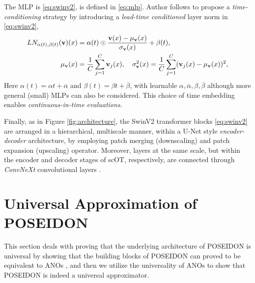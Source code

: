\documentclass[reqno,10pt]{amsart}
\theoremstyle{plain}
\theoremstyle{definition}
\begin{document}
\noindent The MLP is \ref{eq:swinv2}, is defined in \ref{eq:mlp}. Author follows \cite{EP2017} to propose a {\it time-conditioning} strategy by introducing a {\it lead-time conditioned} layer norm in \ref{eq:swinv2},
\begin{equation} \label{eq:LN}
    \begin{aligned}
        LN_{\alpha(t),\beta(t)}({\bf v})(x) &= \alpha(t) \odot \frac{{\bf v}(x) - \mu_{{\bf v}}(x)}{\sigma_{\bf v}(x)} + \beta(t), \\
        \mu_{{\bf v}}(x) &= \frac{1}{C}\sum_{j=1}^{C} {\bf v}_j(x), \quad \sigma_{{\bf v}}^2(x) = \frac{1}{C} \sum_{j=1}^{C} ({\bf v}_j(x) - \mu_{{\bf v}}(x))^2,
    \end{aligned}
\end{equation}
Here $\alpha(t) = \alpha t + \overline{\alpha}$ and $\beta(t) = \beta t + \overline{\beta}$, with learnable $\alpha, \overline{\alpha}, \beta, \overline{\beta}$ although more general (small) MLPs can also be considered. This choice of time embedding enables {\it continuous-in-time evaluations}.

Finally, as in Figure \ref{fig:architecture}, the SwinV2 transformer blocks \ref{eq:swinv2} are arranged in a hierarchical, multiscale manner, within a U-Net style {\it encoder-decoder} architecture, by employing patch merging (downscaling) and patch expansion (upscaling) operator. Moreover, layers at the same scale, but within the encoder and decoder stages of scOT, respectively, are connected through {\it ConvNeXt} convolutional layers \cite{ZLiu2022}.

\section{\bf Universal Approximation of POSEIDON}
\noindent This section deals with proving that the underlying architecture of POSEIDON is universal by showing that the building blocks of POSEIDON can proved to be equivalent to ANOs \cite{SL2024}, and then we utilize the universality of ANOs to show that POSEIDON is indeed a universal approximator.
\end{document}
